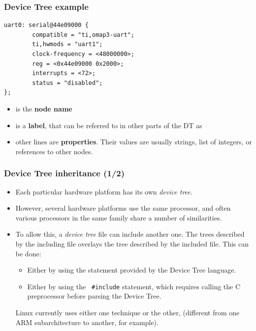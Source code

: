 \begin{frame}[fragile]
  \frametitle{Device Tree example}
  \begin{block}{}
\begin{verbatim}
uart0: serial@44e09000 {
        compatible = "ti,omap3-uart";
        ti,hwmods = "uart1";
        clock-frequency = <48000000>;
        reg = <0x44e09000 0x2000>;
        interrupts = <72>;
        status = "disabled";
};
  \end{verbatim}
  \end{block}
  \normalsize
  \begin{itemize}
  \item {} is the {\bf node name}
  \item {} is a {\bf label}, that can be referred to in other
    parts of the DT as 
  \item other lines are {\bf properties}. Their values are usually
    strings, list of integers, or references to other nodes.
  \end{itemize}
\end{frame}

\begin{frame}
  \frametitle{Device Tree inheritance (1/2)}
  \begin{itemize}
  \item Each particular hardware platform has its own {\em device tree}.
  \item However, several hardware platforms use the same processor,
    and often various processors in the same family share a number of
    similarities.
  \item To allow this, a {\em device tree} file can include another
    one. The trees described by the including file overlays the tree
    described by the included file. This can be done:
    \begin{itemize}
       \item Either by using the  statement
         provided by the Device Tree language.
       \item Either by using the {\tt
         \#include} statement, which requires calling the C
         preprocessor before parsing the Device Tree.
    \end{itemize}
    Linux currently uses either one technique or the other,
    (different from one ARM subarchitecture to another, for example).
  \end{itemize}
\end{frame}

